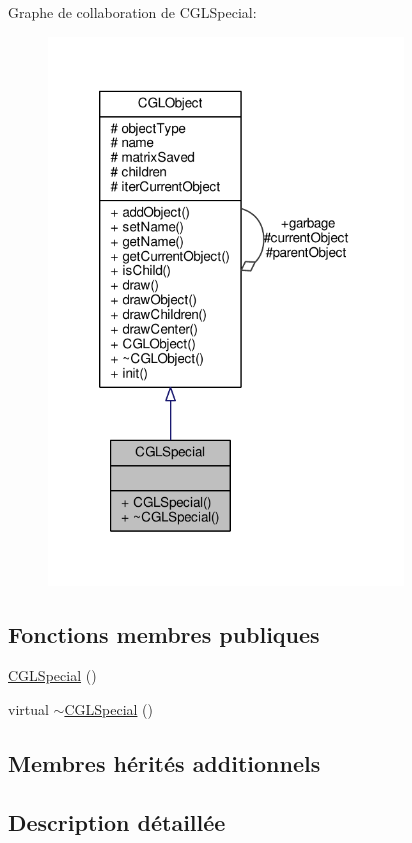 Graphe de collaboration de C\-G\-L\-Special\-:\nopagebreak
\begin{figure}[H]
\begin{center}
\leavevmode
\includegraphics[width=267pt]{d1/d9f/class_c_g_l_special__coll__graph}
\end{center}
\end{figure}
\subsection*{Fonctions membres publiques}
\begin{DoxyCompactItemize}
\item 
\hyperlink{class_c_g_l_special_a897ae06287f83628c5d3af05135f05f1}{C\-G\-L\-Special} ()
\item 
virtual \hyperlink{class_c_g_l_special_a73dcc1a3cc05683f0fe8640aa219b68c}{$\sim$\-C\-G\-L\-Special} ()
\end{DoxyCompactItemize}
\subsection*{Membres hérités additionnels}


\subsection{Description détaillée}



